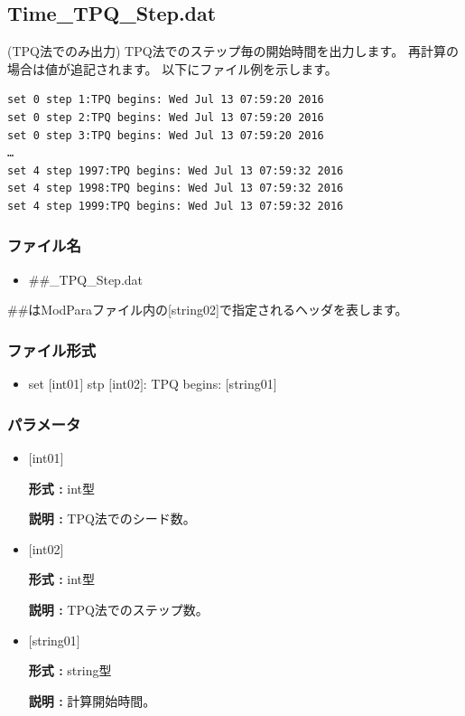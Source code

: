 \newpage
\subsection{Time\_TPQ\_Step.dat}
(TPQ法でのみ出力) TPQ法でのステップ毎の開始時間を出力します。
再計算の場合は値が追記されます。
以下にファイル例を示します。\\
\begin{minipage}{15cm}
\begin{screen}
\begin{verbatim}
set 0 step 1:TPQ begins: Wed Jul 13 07:59:20 2016
set 0 step 2:TPQ begins: Wed Jul 13 07:59:20 2016
set 0 step 3:TPQ begins: Wed Jul 13 07:59:20 2016
…
set 4 step 1997:TPQ begins: Wed Jul 13 07:59:32 2016
set 4 step 1998:TPQ begins: Wed Jul 13 07:59:32 2016
set 4 step 1999:TPQ begins: Wed Jul 13 07:59:32 2016
\end{verbatim}
\end{screen}
\end{minipage}

\subsubsection{ファイル名}
 \begin{itemize}
   \item  \#\#\_TPQ\_Step.dat
  \end{itemize}
  \#\#はModParaファイル内の[string02]で指定されるヘッダを表します。


\subsubsection{ファイル形式}
 \begin{itemize}
   \item set $[$int01$]$ stp $[$int02$]$: TPQ begins: $[$string01$]$
  \end{itemize}
\subsubsection{パラメータ}
 \begin{itemize}

  \item  $[$int01$]$
  
 {\bf 形式 :} int型

{\bf 説明 :} TPQ法でのシード数。
 
  \item  $[$int02$]$
  
 {\bf 形式 :} int型

{\bf 説明 :} TPQ法でのステップ数。

  \item  $[$string01$]$
  
 {\bf 形式 :} string型

{\bf 説明 :} 計算開始時間。

 \end{itemize}

